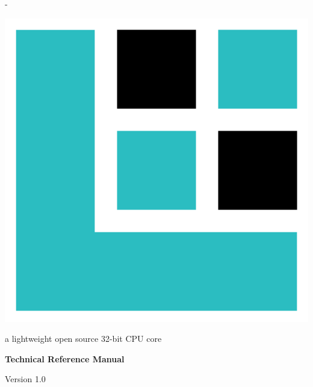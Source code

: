 \frontmatter


\thispagestyle{empty}
\calccentering{\unitlength}
\begin{adjustwidth*}{\unitlength}{-\unitlength}
	\vspace*{\fill}
	\begin{center}
	\DoubleSpacing
	\includegraphics[scale=0.2]{images/lxp32-logo.pdf}\par
	\vspace{\onelineskip}
	\huge \lxp{}\par
	\Large a lightweight open source 32-bit CPU core\par
	\LARGE \textbf{Technical Reference Manual}\par
	\vspace{1.2\onelineskip}
	\large Version 1.0\par
	\vspace*{4\onelineskip}
	\end{center}
	\vspace*{\fill}
\end{adjustwidth*}

\clearpage


\thispagestyle{empty}

